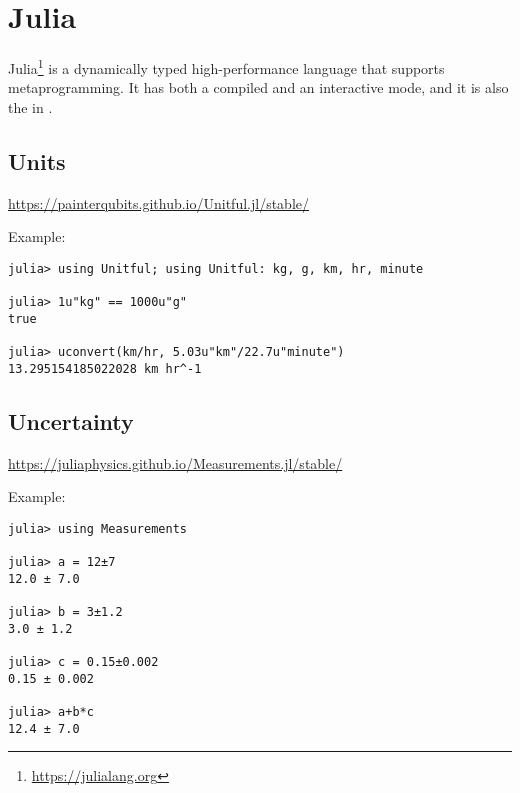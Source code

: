 \section{Julia}
\label{lang:julia}

Julia\footnote{\url{https://julialang.org}} is a dynamically typed high-performance language that supports metaprogramming. It has both a compiled and an interactive mode, and it is also the  in .

\subsection{Units}

\url{https://painterqubits.github.io/Unitful.jl/stable/}

Example:
\begin{verbatim}
julia> using Unitful; using Unitful: kg, g, km, hr, minute

julia> 1u"kg" == 1000u"g"
true

julia> uconvert(km/hr, 5.03u"km"/22.7u"minute")
13.295154185022028 km hr^-1
\end{verbatim}

\subsection{Uncertainty}

\url{https://juliaphysics.github.io/Measurements.jl/stable/}

Example:
\begin{verbatim}
julia> using Measurements

julia> a = 12±7
12.0 ± 7.0

julia> b = 3±1.2
3.0 ± 1.2

julia> c = 0.15±0.002
0.15 ± 0.002

julia> a+b*c
12.4 ± 7.0
\end{verbatim}

